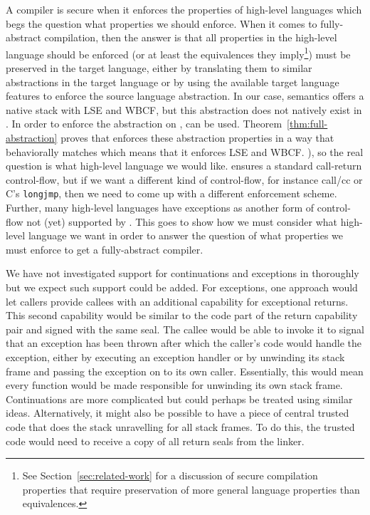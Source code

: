 \begin{jversion}
  A compiler is secure when it enforces the properties of high-level languages which begs the question what properties we should enforce.
  When it comes to fully-abstract compilation, then the answer is that all properties in the
  high-level language should be enforced (or at least the equivalences they imply\footnote{See Section~\ref{sec:related-work} for a discussion of secure compilation properties that require preservation of more general language properties than equivalences.}) must be preserved in the target language, either by translating them to similar abstractions in the target language or by using the available target language features to enforce the source language abstraction.
  In our case, \srccm{} semantics offers a native stack with LSE and WBCF, but this abstraction does not natively exist in \trgcm{}.
  In order to enforce the abstraction on \trgcm{}, \stktokens{} can be used.
  Theorem~\ref{thm:full-abstraction} proves that \stktokens{} enforces these abstraction properties in a way that behaviorally matches \srccm{} which means that it enforces LSE and WBCF.
), so the real question is what high-level language we would like.
  \stktokens{} ensures a standard call-return control-flow, but if we want a different kind of control-flow, for instance call/cc or C's \texttt{longjmp}, then we need to come up with a different enforcement scheme.
  Further, many high-level languages have exceptions as another form of control-flow not (yet) supported by \stktokens{}.
  This goes to show how we must consider what high-level language we want in order to answer the question of what properties we must enforce to get a fully-abstract compiler.

  We have not investigated support for continuations and exceptions in \stktokens{} thoroughly but we expect such support could be added.
  For exceptions, one approach would let callers provide callees with an additional capability for exceptional returns.
  This second capability would be similar to the code part of the return capability pair and signed with the same seal.
  The callee would be able to invoke it to signal that an exception has been thrown after which the caller's code would handle the exception, either by executing an exception handler or by unwinding its stack frame and passing the exception on to its own caller.
  Essentially, this would mean every function would be made responsible for unwinding its own stack frame.
  Continuations are more complicated but could perhaps be treated using similar ideas.
  Alternatively, it might also be possible to have a piece of central trusted code that does the stack unravelling for all stack frames.
  To do this, the trusted code would need to receive a copy of all return seals from the linker.


\end{jversion}
